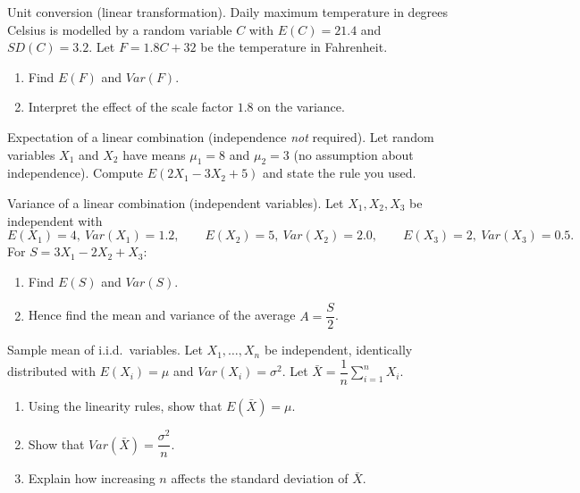 \documentclass[11pt]{article}
\def\textbf#1{#1}%
\def\mathbb#1{#1}%
\def\mathrm#1{#1}%
\newcounter{question}
\begin{document}
\begin{question}
\textbf{Unit conversion (linear transformation).}
Daily maximum temperature in degrees Celsius is modelled by a random variable $C$ with $\mathbb E(C)=21.4$ and $\mathrm{SD}(C)=3.2$.
Let $F=1.8C+32$ be the temperature in Fahrenheit.
\begin{enumerate}
  \item Find $\mathbb E(F)$ and $\mathrm{Var}(F)$.
  \item Interpret the effect of the scale factor $1.8$ on the variance.
\end{enumerate}
\end{question}

\begin{question}
\textbf{Expectation of a linear combination (independence \emph{not} required).}
Let random variables $X_1$ and $X_2$ have means $\mu_1=8$ and $\mu_2=3$ (no assumption about independence).
Compute $\mathbb E(2X_1-3X_2+5)$ and state the rule you used.
\end{question}

\begin{question}
\textbf{Variance of a linear combination (independent variables).}
Let $X_1,X_2,X_3$ be independent with
\[
\mathbb E(X_1)=4,\ \mathrm{Var}(X_1)=1.2,\qquad
\mathbb E(X_2)=5,\ \mathrm{Var}(X_2)=2.0,\qquad
\mathbb E(X_3)=2,\ \mathrm{Var}(X_3)=0.5.
\]
For $S=3X_1-2X_2+X_3$:
\begin{enumerate}
  \item Find $\mathbb E(S)$ and $\mathrm{Var}(S)$.
  \item Hence find the mean and variance of the average $A=\dfrac{S}{2}$.
\end{enumerate}
\end{question}

\begin{question}
\textbf{Sample mean of i.i.d.\ variables.}
Let $X_1,\ldots,X_n$ be independent, identically distributed with $\mathbb E(X_i)=\mu$ and $\mathrm{Var}(X_i)=\sigma^2$.
Let $\bar X=\dfrac{1}{n}\sum_{i=1}^n X_i$.
\begin{enumerate}
  \item Using the linearity rules, show that $\mathbb E(\bar X)=\mu$.
  \item Show that $\mathrm{Var}(\bar X)=\dfrac{\sigma^2}{n}$.
  \item Explain how increasing $n$ affects the standard deviation of $\bar X$.
\end{enumerate}
\end{question}
\end{document}
